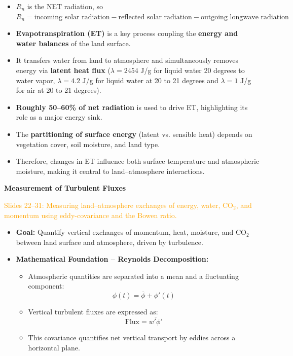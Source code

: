 \documentclass[fontsize=8pt, a4paper, landscape, fleqn]{scrartcl}
\renewcommand{\subsection}[1]{%
    \noindent\colorbox{subsectioncolor}{%
        \parbox{\dimexpr\columnwidth-2\fboxsep}{\color{white}\textbf{#1}}}%
    \vspace{0.5mm}%
}
\begin{document}
\begin{multicols*}{3}[\raggedcolumns]
\begin{itemize}
    \item $R_n$ is the NET radiation, so $R_n = \text{incoming solar radiation} - \text{reflected solar radiation} - \text{outgoing longwave radiation}$
    \item \textbf{Evapotranspiration (ET)} is a key process coupling the \textbf{energy and water balances} of the land surface.
    \item It transfers water from land to atmosphere and simultaneously removes energy via \textbf{latent heat flux} ($\lambda = 2454$ J/g for liquid water 20 degrees to water vapor, $\lambda = 4.2$ J/g for liquid water at 20 to 21 degrees and $\lambda = 1$ J/g for air at 20 to 21 degrees).
    \item \textbf{Roughly 50–60\% of net radiation} is used to drive ET, highlighting its role as a major energy sink.
    \item The \textbf{partitioning of surface energy} (latent vs. sensible heat) depends on vegetation cover, soil moisture, and land type.
    \item Therefore, changes in ET influence both surface temperature and atmospheric moisture, making it central to land–atmosphere interactions.
\end{itemize}
\subsection{Measurement of Turbulent Fluxes}
\noindent \textcolor{orange}{Slides 22–31: Measuring land–atmosphere exchanges of energy, water, CO$_2$, and momentum using eddy-covariance and the Bowen ratio.}

\begin{itemize}
    \item \textbf{Goal:} Quantify vertical exchanges of momentum, heat, moisture, and CO$_2$ between land surface and atmosphere, driven by turbulence.

    \item \textbf{Mathematical Foundation – Reynolds Decomposition:}
    \begin{itemize}
        \item Atmospheric quantities are separated into a mean and a fluctuating component:
        \[
        \phi(t) = \overline{\phi} + \phi'(t)
        \]
        \item Vertical turbulent fluxes are expressed as:
        \[
        \text{Flux} = \overline{w' \phi'}
        \]
        \item This covariance quantifies net vertical transport by eddies across a horizontal plane.
    \end{itemize}


\end{itemize}
\end{multicols*}
\end{document}
